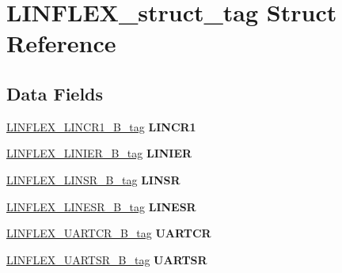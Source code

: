 \hypertarget{structLINFLEX__struct__tag}{}\section{L\+I\+N\+F\+L\+E\+X\+\_\+struct\+\_\+tag Struct Reference}
\label{structLINFLEX__struct__tag}
\subsection*{Data Fields}
\begin{DoxyCompactItemize}
\item 
\mbox{\label{structLINFLEX__struct__tag_a711437558d5c5713512eb93e92023498}} 
\mbox{\hyperlink{unionLINFLEX__LINCR1__32B__tag}{L\+I\+N\+F\+L\+E\+X\+\_\+\+L\+I\+N\+C\+R1\+\_\+B\+\_\+tag}} {\bfseries L\+I\+N\+C\+R1}
\item 
\mbox{\label{structLINFLEX__struct__tag_adab6ff16ec103d145eea8c3cf05039b0}} 
\mbox{\hyperlink{unionLINFLEX__LINIER__32B__tag}{L\+I\+N\+F\+L\+E\+X\+\_\+\+L\+I\+N\+I\+E\+R\+\_\+B\+\_\+tag}} {\bfseries L\+I\+N\+I\+ER}
\item 
\mbox{\label{structLINFLEX__struct__tag_af9de260c5c7defd5019b76ba3bb45284}} 
\mbox{\hyperlink{unionLINFLEX__LINSR__32B__tag}{L\+I\+N\+F\+L\+E\+X\+\_\+\+L\+I\+N\+S\+R\+\_\+B\+\_\+tag}} {\bfseries L\+I\+N\+SR}
\item 
\mbox{\label{structLINFLEX__struct__tag_a96bf29867f7d3410b61d46dbd286c8e0}} 
\mbox{\hyperlink{unionLINFLEX__LINESR__32B__tag}{L\+I\+N\+F\+L\+E\+X\+\_\+\+L\+I\+N\+E\+S\+R\+\_\+B\+\_\+tag}} {\bfseries L\+I\+N\+E\+SR}
\item 
\mbox{\label{structLINFLEX__struct__tag_a23a7f0fadde27d5ee89abdaa12041b78}} 
\mbox{\hyperlink{unionLINFLEX__UARTCR__32B__tag}{L\+I\+N\+F\+L\+E\+X\+\_\+\+U\+A\+R\+T\+C\+R\+\_\+B\+\_\+tag}} {\bfseries U\+A\+R\+T\+CR}
\item 
\mbox{\label{structLINFLEX__struct__tag_a4fd3c699d2ace34a26fc92ca151a0ac8}} 
\mbox{\hyperlink{unionLINFLEX__UARTSR__32B__tag}{L\+I\+N\+F\+L\+E\+X\+\_\+\+U\+A\+R\+T\+S\+R\+\_\+B\+\_\+tag}} {\bfseries U\+A\+R\+T\+SR}

\end{DoxyCompactItemize}
